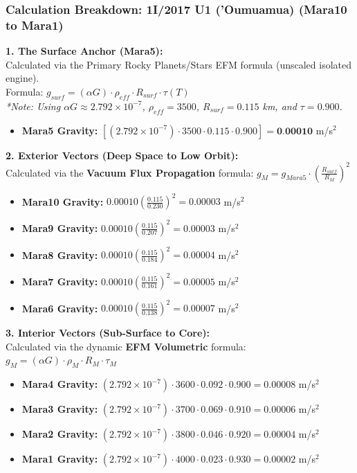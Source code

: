 \documentclass[11pt, a4paper]{article}
\begin{document}
\clearpage
\subsubsection{Calculation Breakdown: 1I/2017 U1 ('Oumuamua) (Mara10 to Mara1)}

\noindent \textbf{1. The Surface Anchor (Mara5):} \\
Calculated via the Primary Rocky Planets/Stars EFM formula (unscaled isolated engine). \\
Formula: $g_{surf} = (\alpha G) \cdot \rho_{eff} \cdot R_{surf} \cdot \tau(T)$ \\
\textit{*Note: Using $\alpha G \approx 2.792 \times 10^{-7}$, $\rho_{eff} = 3500$, $R_{surf} = 0.115$ km, and $\tau = 0.900$.}
\begin{itemize}
  \item \textbf{Mara5 Gravity:} $\left[ (2.792 \times 10^{-7}) \cdot 3500 \cdot 0.115 \cdot 0.900 \right] = \textbf{0.00010}$ m/s$^2$
\end{itemize}

\vspace{0.5em}
\noindent \textbf{2. Exterior Vectors (Deep Space to Low Orbit):} \\
Calculated via the \textbf{Vacuum Flux Propagation} formula: $g_M = g_{Mara5} \cdot \left( \frac{R_{surf}}{R_M} \right)^2$
\begin{itemize}
  \item \textbf{Mara10 Gravity:} $0.00010 \left( \frac{0.115}{0.230} \right)^2 = 0.00003$ m/s$^2$
  \item \textbf{Mara9 Gravity:} $0.00010 \left( \frac{0.115}{0.207} \right)^2 = 0.00003$ m/s$^2$
  \item \textbf{Mara8 Gravity:} $0.00010 \left( \frac{0.115}{0.184} \right)^2 = 0.00004$ m/s$^2$
  \item \textbf{Mara7 Gravity:} $0.00010 \left( \frac{0.115}{0.161} \right)^2 = 0.00005$ m/s$^2$
  \item \textbf{Mara6 Gravity:} $0.00010 \left( \frac{0.115}{0.138} \right)^2 = 0.00007$ m/s$^2$
\end{itemize}

\vspace{0.5em}
\noindent \textbf{3. Interior Vectors (Sub-Surface to Core):} \\
Calculated via the dynamic \textbf{EFM Volumetric} formula: $g_M = (\alpha G) \cdot \rho_{M} \cdot R_M \cdot \tau_M$
\begin{itemize}
  \item \textbf{Mara4 Gravity:} $(2.792 \times 10^{-7}) \cdot 3600 \cdot 0.092 \cdot 0.900 = 0.00008$ m/s$^2$
  \item \textbf{Mara3 Gravity:} $(2.792 \times 10^{-7}) \cdot 3700 \cdot 0.069 \cdot 0.910 = 0.00006$ m/s$^2$
  \item \textbf{Mara2 Gravity:} $(2.792 \times 10^{-7}) \cdot 3800 \cdot 0.046 \cdot 0.920 = 0.00004$ m/s$^2$
  \item \textbf{Mara1 Gravity:} $(2.792 \times 10^{-7}) \cdot 4000 \cdot 0.023 \cdot 0.930 = 0.00002$ m/s$^2$
\end{itemize}
\end{document}
